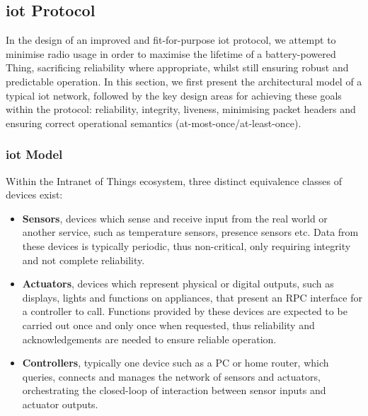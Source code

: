 \documentclass[conference]{./sty/IEEEtran}
\begin{document}
\subsection{iot Protocol} %
\label{sub:design_iot_protocol}
In the design of an improved and fit-for-purpose iot protocol, we attempt to minimise radio usage in order to maximise the lifetime of a battery-powered Thing, sacrificing reliability where appropriate, whilst still ensuring robust and predictable operation. In this section, we first present the architectural model of a typical iot network, followed by the key design areas for achieving these goals within the protocol: reliability, integrity, liveness, minimising packet headers and ensuring correct operational semantics (at-most-once/at-least-once). 

\subsubsection*{iot Model} %
\label{ssub:iot_model}
Within the Intranet of Things ecosystem, three distinct equivalence classes of devices exist:
\begin{itemize}
  \item \textbf{Sensors}, devices which sense and receive input from the real world or another service, such as temperature sensors, presence sensors etc. Data from these devices is typically periodic, thus non-critical, only requiring integrity and not complete reliability.
  \item \textbf{Actuators}, devices which represent physical or digital outputs, such as displays, lights and functions on appliances, that present an RPC interface for a controller to call. Functions provided by these devices are expected to be carried out once and only once when requested, thus reliability and acknowledgements are needed to ensure reliable operation. 
  \item \textbf{Controllers}, typically one device such as a PC or home router, which queries, connects and manages the network of sensors and actuators, orchestrating the closed-loop of interaction between sensor inputs and actuator outputs.
\end{itemize}
\end{document}
